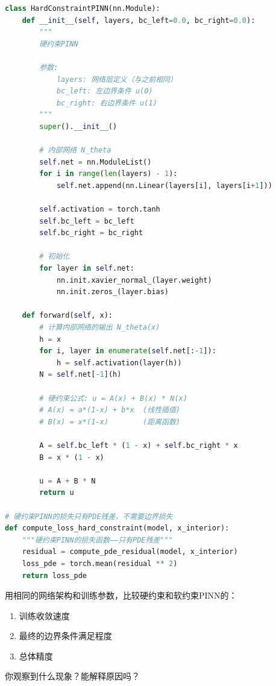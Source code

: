 \begin{lstlisting}[language=Python, caption={硬约束PINN的实现}]
class HardConstraintPINN(nn.Module):
    def __init__(self, layers, bc_left=0.0, bc_right=0.0):
        """
        硬约束PINN
        
        参数:
            layers: 网络层定义（与之前相同）
            bc_left: 左边界条件 u(0)
            bc_right: 右边界条件 u(1)
        """
        super().__init__()
        
        # 内部网络 N_theta
        self.net = nn.ModuleList()
        for i in range(len(layers) - 1):
            self.net.append(nn.Linear(layers[i], layers[i+1]))
        
        self.activation = torch.tanh
        self.bc_left = bc_left
        self.bc_right = bc_right
        
        # 初始化
        for layer in self.net:
            nn.init.xavier_normal_(layer.weight)
            nn.init.zeros_(layer.bias)
    
    def forward(self, x):
        # 计算内部网络的输出 N_theta(x)
        h = x
        for i, layer in enumerate(self.net[:-1]):
            h = self.activation(layer(h))
        N = self.net[-1](h)
        
        # 硬约束公式: u = A(x) + B(x) * N(x)
        # A(x) = a*(1-x) + b*x  (线性插值)
        # B(x) = x*(1-x)        (距离函数)
        
        A = self.bc_left * (1 - x) + self.bc_right * x
        B = x * (1 - x)
        
        u = A + B * N
        return u

# 硬约束PINN的损失只有PDE残差，不需要边界损失
def compute_loss_hard_constraint(model, x_interior):
    """硬约束PINN的损失函数——只有PDE残差"""
    residual = compute_pde_residual(model, x_interior)
    loss_pde = torch.mean(residual ** 2)
    return loss_pde
\end{lstlisting}

\begin{exercise}[title = 硬约束 vs 软约束]
用相同的网络架构和训练参数，比较硬约束和软约束PINN的：
\begin{enumerate}
    \item 训练收敛速度
    \item 最终的边界条件满足程度
    \item 总体精度
\end{enumerate}
你观察到什么现象？能解释原因吗？
\end{exercise}

